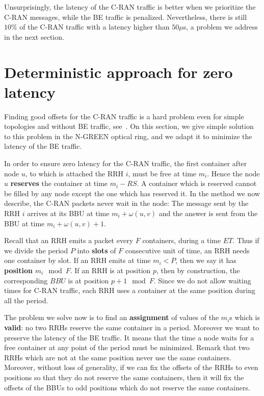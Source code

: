 \documentclass[]{algotel}
\begin{document}
Unsurprisingly, the latency of the C-RAN traffic is better when we prioritize the C-RAN messages, while the BE traffic is penalized. Nevertheless, there is still $10\%$ of the C-RAN traffic with a latency higher than $50 \mu$s, a problem we address in the next section.


\section{Deterministic approach for zero latency} \label{sec:deterministicalgorithms}

Finding good offsets for the C-RAN traffic is a hard problem even for simple topologies and without BE traffic, see~\cite{dominique2018deterministic}. On this section, we give simple solution to this problem in the N-GREEN optical ring, and we adapt it to minimize the latency of the BE traffic.

In order to ensure zero latency for the C-RAN traffic, the first container after node $u$, to which is attached the RRH $i$, must be free at time $m_i$. Hence the node $u$ \textbf{reserves} the container at time $m_i - RS$. A container which is reserved cannot be filled by any node except the one which has reserved it. In the method we now describe, the C-RAN packets never wait in the node: The message sent by the RRH $i$ arrives at its BBU at time $m_i + \omega(u,v)$ and the answer is sent from the BBU at time $m_i + \omega(u,v) +1$.

Recall that an RRH emits a packet every $F$ containers, during a time $ET$. 
Thus if we divide the period $P$ into \textbf{slots} of $F$ consecutive unit of time, an RRH needs one container by slot.
 If an RRH emits at time $m_i < P$, then we say it has \textbf{position} $m_i \mod F$. If an RRH is at position $p$, then by construction, the corresponding $BBU$ is at position $p+1 \mod F$. Since we do not allow waiting times for C-RAN traffic, each RRH uses a container at the same position during all the period.

The problem we solve now is to find an \textbf{assignment} of values of the $m_i$s which is \textbf{valid}: no two RRHs reserve the same container in a period. Moreover we want to preserve the latency of the BE traffic. It means that the time a node waits for a free container at any point of the period must be minimized. 
Remark that two RRHs which are not at the same position never use the same containers. Moreover, without loss of generality, 
if we can fix the offsets of the RRHs to even positions so that they do not reserve the same containers, then it will fix the offsets of the BBUs to odd positions which do not reserve the same containers. 
\end{document}
